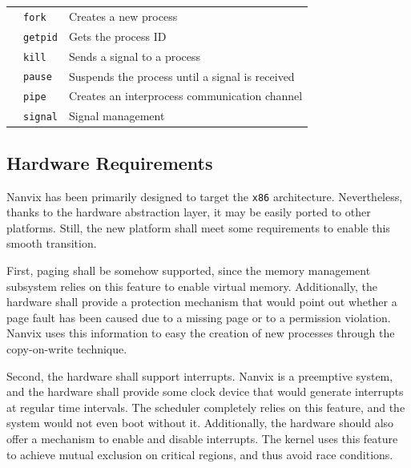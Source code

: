 \documentclass[10pt,a4paper]{article}
\begin{document}
\begin{table}[t]
\begin{tabular}{l l l}
	                                     & \texttt{fork}     & Creates a new process                           \\
	                                     & \texttt{getpid}   & Gets the process ID                             \\
	                                     & \texttt{kill}     & Sends a signal to a process                     \\
	                                     & \texttt{pause}    & Suspends the process until a signal is received \\
	                                     & \texttt{pipe}     & Creates an interprocess communication channel   \\
	                                     & \texttt{signal}   & Signal management                               \\
	\bottomrule
\end{tabular}
\end{table}

\subsection{Hardware Requirements}
\label{section: hardware requirements}

Nanvix has been primarily designed to target the \texttt{x86} architecture. Nevertheless, thanks to the hardware abstraction layer, it may be easily ported to other platforms. Still, the new platform shall meet some requirements to enable this smooth transition.

First, paging shall be somehow supported, since the memory management subsystem relies on this feature to enable virtual memory. Additionally, the hardware shall provide a protection mechanism that would point out whether a page fault has been caused due to a missing page or to a permission violation. Nanvix uses this information to easy the creation of new processes through the copy-on-write technique.

Second, the hardware shall support interrupts. Nanvix is a preemptive system, and the hardware shall provide some clock device that would generate interrupts at regular time intervals. The scheduler completely relies on this feature, and the system would not even boot without it. Additionally, the hardware should also offer a mechanism to enable and disable interrupts. The kernel uses this feature to achieve mutual exclusion on critical regions, and thus avoid race conditions.
\end{document}

